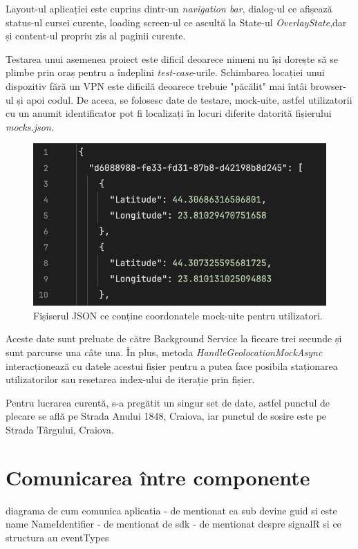 Layout-ul aplicației este cuprins dintr-un \textit{navigation bar}, dialog-ul ce afișează status-ul cursei curente, loading screen-ul
ce ascultă la State-ul \textit{OverlayState},dar și content-ul propriu zis al paginii curente.

Testarea unui asemenea proiect este dificil deoarece nimeni nu își dorește să se plimbe prin oraș pentru a îndeplini \textit{test-case}-urile.
Schimbarea locației unui dispozitiv fără un VPN este dificilă deoarece trebuie "păcălit" mai întâi browser-ul și apoi codul.
De aceea, se folosesc date de testare, mock-uite, astfel utilizatorii cu un anumit identificator pot fi localizați în locuri
diferite datorită fișierului \textit{mocks.json}.

\begin{figure}[H]
    \centering
    \includegraphics[width=14cm]{Assets/dynamicMocks.png}
    \caption{Fișiserul JSON ce conține coordonatele mock-uite pentru utilizatori.}
    \label{fig:dynamicMocks}
\end{figure}

Aceste date sunt preluate de către Background Service la fiecare trei secunde și sunt parcurse una câte una.
În plus, metoda \textit{HandleGeolocationMockAsync} interacționează cu datele acestui fișier pentru a putea 
face posibila staționarea utilizatorilor sau resetarea index-ului de iterație prin fișier.

Pentru lucrarea curentă, s-a pregătit un singur set de date, astfel punctul de plecare se află 
pe Strada Anului 1848, Craiova, iar punctul de sosire este pe Strada Târgului, Craiova.

\section{Comunicarea între componente}
diagrama de cum comunica aplicatia
- de mentionat ca sub devine guid si este name NameIdentifier
- de mentionat de sdk 
- de mentionat despre signalR si ce structura au eventTypes